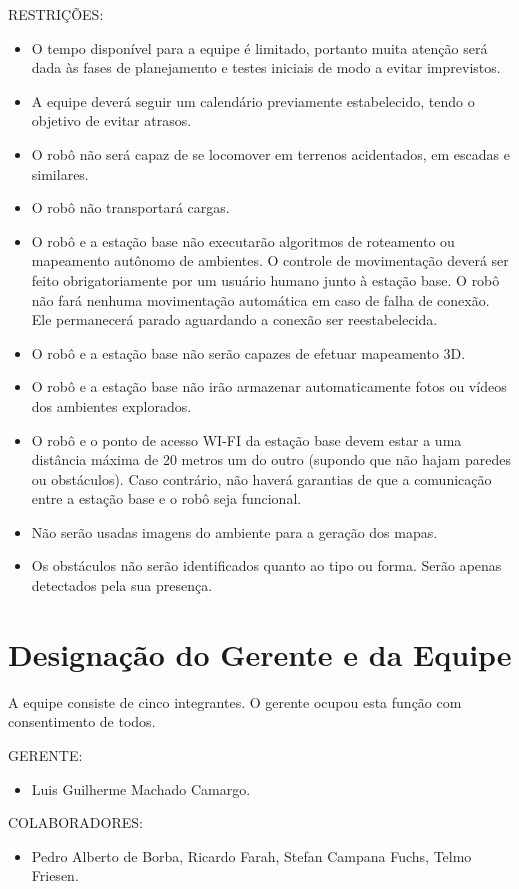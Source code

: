 RESTRIÇÕES:
\begin{itemize}
  \item O tempo disponível para a equipe é limitado, portanto muita atenção será dada às fases de planejamento e testes iniciais de modo a evitar imprevistos.
  \item A equipe deverá seguir um calendário previamente estabelecido, tendo o objetivo de evitar atrasos.
  \item O robô não será capaz de se locomover em terrenos acidentados, em escadas e similares.
  \item O robô não transportará cargas.
  \item O robô e a estação base não executarão algoritmos de roteamento ou mapeamento autônomo de ambientes. O controle de movimentação deverá ser feito obrigatoriamente por um usuário humano junto à estação base. O robô não fará nenhuma movimentação automática em caso de falha de conexão. Ele permanecerá parado aguardando a conexão ser reestabelecida.
  \item O robô e a estação base não serão capazes de efetuar mapeamento 3D.
  \item O robô e a estação base não irão armazenar automaticamente fotos ou vídeos dos ambientes explorados.
  \item O robô e o ponto de acesso WI-FI da estação base devem estar a uma distância máxima de 20 metros um do outro (supondo que não hajam paredes ou obstáculos). Caso contrário, não haverá garantias de que a comunicação entre a estação base e o robô seja funcional.
  \item Não serão usadas imagens do ambiente para a geração dos mapas.
  \item Os obstáculos não serão identificados quanto ao tipo ou forma. Serão apenas detectados pela sua presença.
\end{itemize}

\chapter{Designação do Gerente e da Equipe}
A equipe consiste de cinco integrantes. O gerente ocupou esta função com consentimento de todos.

GERENTE:
\begin{itemize}
  \item Luis Guilherme Machado Camargo.
\end{itemize}
COLABORADORES:	
\begin{itemize}
  \item Pedro Alberto de Borba, Ricardo Farah, Stefan Campana Fuchs, Telmo Friesen.
\end{itemize}


